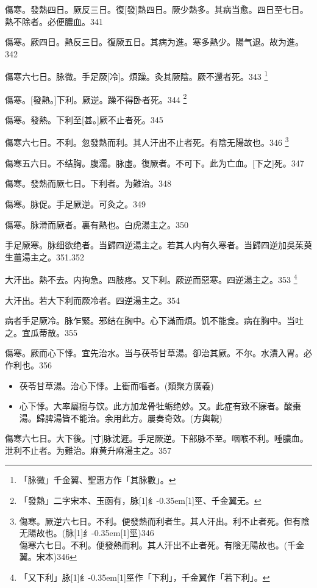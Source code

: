 \documentclass[11pt,oneside,b5paper]{ctexbook}
\begin{document}
\begin{flushleft}
傷寒。發熱四日。厥反三日。復[發]熱四日。厥少熱多。其病当愈。四日至七日。熱不除者。必便膿血。341

傷寒。厥四日。熱反三日。復厥五日。其病为進。寒多熱少。陽气退。故为進。342

傷寒六七日。脉微。手足厥[冷]。煩躁。灸其厥陰。厥不還者死。343
\footnote{「脉微」千金翼、聖惠方作「其脉數」。}

傷寒。[發熱。]下利。厥逆。躁不得卧者死。344
\footnote{「發熱」二字宋本、玉函有，脉{\hbox{\scalebox{0.68}[1]{纟}\kern-0.35em\scalebox{0.64}[1]{巠}}}、千金翼无。}

傷寒。發熱。下利至[甚。]厥不止者死。345

傷寒六七日。不利。忽發熱而利。其人汗出不止者死。有陰无陽故也。346
\footnote{傷寒。厥逆六七日。不利。便發熱而利者生。其人汗出。利不止者死。但有陰无陽故也。(脉{\hbox{\scalebox{0.68}[1]{纟}\kern-0.35em\scalebox{0.64}[1]{巠}}})346\\傷寒六七日。不利。便發熱而利。其人汗出不止者死。有陰无陽故也。(千金翼。宋本)346}

傷寒五六日。不结胸。腹濡。脉虛。復厥者。不可下。此为亡血。[下之]死。347

傷寒。發熱而厥七日。下利者。为難治。348

傷寒。脉促。手足厥逆。可灸之。349

傷寒。脉滑而厥者。裏有熱也。白虎湯主之。350

手足厥寒。脉细欲绝者。当歸四逆湯主之。若其人内有久寒者。当歸四逆加吳茱萸生薑湯主之。351.352

大汗出。熱不去。内拘急。四肢疼。又下利。厥逆而惡寒。四逆湯主之。353
\footnote{「又下利」脉{\hbox{\scalebox{0.68}[1]{纟}\kern-0.35em\scalebox{0.64}[1]{巠}}}作「下利」，千金翼作「若下利」。}

大汗出。若大下利而厥冷者。四逆湯主之。354

病者手足厥冷。脉乍緊。邪结在胸中。心下滿而煩。饥不能食。病在胸中。当吐之。宜瓜蒂散。355

傷寒。厥而心下悸。宜先治水。当与茯苓甘草湯。卻治其厥。不尔。水漬入胃。必作利也。356

\begin{itemize}
\item 茯苓甘草湯。治心下悸。上衝而嘔者。(類聚方廣義)
\item 心下悸。大率屬癇与饮。此方加龙骨牡蛎绝妙。又。此症有致不寐者。酸棗湯。歸脾湯皆不能治。余用此方。屢奏奇效。(方輿輗)
\end{itemize}

傷寒六七日。大下後。[寸]脉沈遲。手足厥逆。下部脉不至。咽喉不利。唾膿血。泄利不止者。为難治。麻黄升麻湯主之。357


\end{flushleft}
\end{document}
